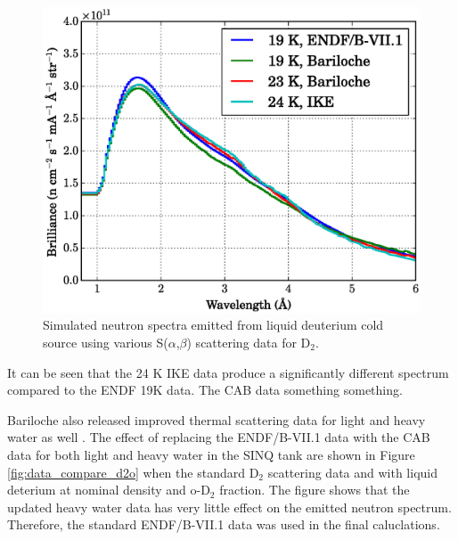 \documentclass[5p,12pt]{elsarticle}
\begin{document}
\begin{figure}[h!] 
  \centering
    \includegraphics[width=\columnwidth]{graphics/data_compare_d2.eps}
     \caption{Simulated neutron spectra emitted from liquid deuterium cold source using various S($\alpha$,$\beta$) scattering data for D$_2$. \label{fig:data_compare_d2}}
\end{figure}

It can be seen that the 24 K IKE data produce a significantly different spectrum compared to the ENDF 19K data.  The CAB data something something.  

Bariloche also released improved thermal scattering data for light and heavy water as well \cite{granada_d2o_1,granada_d2o_2,granada_d2o_3}.  The effect of replacing the ENDF/B-VII.1 data with the CAB data for both light and heavy water in the SINQ tank are shown in Figure \ref{fig:data_compare_d2o} when the standard D$_2$ scattering data and with liquid deterium at nominal density and o-D$_2$ fraction.  The figure shows that the updated heavy water data has very little effect on the emitted neutron spectrum.  Therefore, the standard ENDF/B-VII.1 data was used in the final caluclations.
\end{document}
